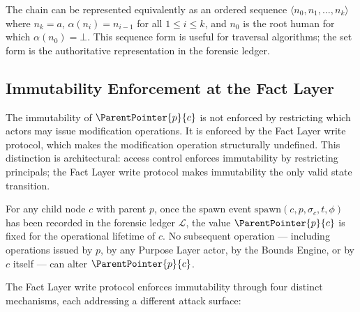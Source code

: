 The chain can be represented equivalently as an ordered sequence $\langle n_0, n_1, \ldots, n_k \rangle$ where $n_k = a$, $\alpha(n_i) = n_{i-1}$ for all $1 \leq i \leq k$, and $n_0$ is the root human for which $\alpha(n_0) = \bot$. This sequence form is useful for traversal algorithms; the set form is the authoritative representation in the forensic ledger.

\subsection{Immutability Enforcement at the Fact Layer}
\label{sec:rs-immutability-enforcement}

The immutability of $\ParentPointer{p}{c}$ is not enforced by restricting which actors may issue modification operations. It is enforced by the Fact Layer write protocol, which makes the modification operation structurally undefined. This distinction is architectural: access control enforces immutability by restricting principals; the Fact Layer write protocol makes immutability the only valid state transition.

\begin{prop}
\label{prop:rs-parent-pointer-immutable}
For any child node $c$ with parent $p$, once the spawn event $\mathrm{spawn}(c, p, \sigma_c, t, \phi)$ has been recorded in the forensic ledger $\mathcal{L}$, the value $\ParentPointer{p}{c}$ is fixed for the operational lifetime of $c$. No subsequent operation --- including operations issued by $p$, by any Purpose Layer actor, by the Bounds Engine, or by $c$ itself --- can alter $\ParentPointer{p}{c}$.
\end{prop}

The Fact Layer write protocol enforces immutability through four distinct mechanisms, each addressing a different attack surface:

